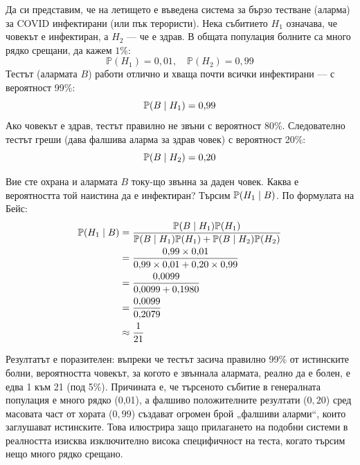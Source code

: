 \begin{example}\label{ex:03-5}

Да си представим, че на летището е въведена система за бързо тестване (аларма) за COVID инфектирани (или пък терористи).
Нека събитието $H_1$ означава, че човекът е инфектиран, а $H_2$ — че е здрав.
В общата популация болните са много рядко срещани, да кажем $1\%$:
\[
\mathbb{P}(H_1) = 0{,}01, \quad \mathbb{P}(H_2) = 0{,}99
\]
Тестът (алармата $B$) работи отлично и хваща почти всички инфектирани — с вероятност 99\%:
\[
\mathbb{P}(B \mid H_1) = 0{,}99
\]
Ако човекът е здрав, тестът правилно не звъни с вероятност 80\%. Следователно тестът греши (дава фалшива аларма за здрав човек) с вероятност 20\%:
\[
\mathbb{P}(B \mid H_2) = 0{,}20
\]

Вие сте охрана и алармата $B$ току-що звънна за даден човек. Каква е вероятността той наистина да е инфектиран? Търсим $\mathbb{P}(H_1 \mid B)$.
По формулата на Бейс:
\begin{align*}
\mathbb{P}(H_1 \mid B) &= \frac{\mathbb{P}(B \mid H_1)\mathbb{P}(H_1)}{\mathbb{P}(B \mid H_1)\mathbb{P}(H_1) + \mathbb{P}(B \mid H_2)\mathbb{P}(H_2)} \\
&= \frac{0{,}99 \times 0{,}01}{0{,}99 \times 0{,}01 + 0{,}20 \times 0{,}99} \\
&= \frac{0{,}0099}{0{,}0099 + 0{,}1980} \\
&= \frac{0{,}0099}{0{,}2079} \\
&\approx \frac{1}{21}
\end{align*}

Резултатът е поразителен: въпреки че тестът засича правилно 99\% от истинските болни, вероятността човекът, за когото е звъннала алармата, реално да е болен, е едва 1 към 21 (под 5\%). Причината е, че търсеното събитие в генералната популация е много рядко (0,01), а фалшиво положителните резултати ($0{,}20$) сред масовата част от хората ($0{,}99$) създават огромен брой „фалшиви аларми“, които заглушават истинските. Това илюстрира защо прилагането на подобни системи в реалността изисква изключително висока специфичност на теста, когато търсим нещо много рядко срещано.

\end{example}

